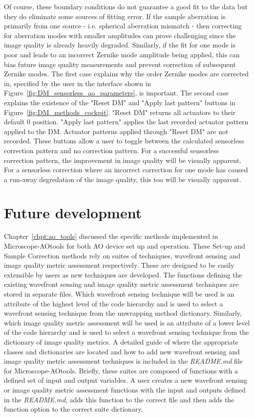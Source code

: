 Of course, these boundary conditions do not guarantee a good fit to the data but they do eliminate some sources of fitting error. If the sample aberration is primarily from one source - i.e. spherical aberration mismatch - then correcting for aberration modes with smaller amplitudes can prove challenging since the image quality is already heavily degraded. Similarly, if the fit for one mode is poor and leads to an incorrect Zernike mode amplitude being applied, this can bias future image quality measurements and prevent correction of subsequent Zernike modes. The first case explains why the order Zernike modes are corrected in, specified by the user in the interface shown in Figure~\ref{fig:DM_sensorless_ao_parameters}, is important. The second case explains the existence of the "Reset DM" and "Apply last pattern" buttons in Figure~\ref{fig:DM_methods_cockpit}. "Reset DM" returns all actuators to their default 0 position. "Apply last pattern" applies the last recorded actuator pattern applied to the DM. Actuator patterns applied through "Reset DM" are not recorded. These buttons allow a user to toggle between the calculated sensorless correction pattern and no correction pattern. For a successful sensorless correction pattern, the improvement in image quality will be visually apparent. For a sensorless correction where an incorrect correction for one mode has caused a run-away degredation of the image quality, this too will be visually apparent.

\section{Future development}
\label{sec:future_dev}

Chapter~\ref{chpt:ao_tools} discussed the specific methods implemented in 
Microscope-AOtools for both AO device set up and operation. These Set-up 
and  Sample Correction methods rely on suites of techniques, wavefront 
sensing and image quality metric assessment respectively. These are 
designed to be easily extensible by users as new techniques are developed. 
The functions defining the existing wavefront sensing and image quality 
metric assessment techniques are stored in separate files. Which wavefront 
sensing technique will be used is an attribute of the highest level
of the code hierarchy and is used to select a wavefront sensing technique 
from the unwrapping method dictionary. Similarly, which image quality 
metric assessment will be used is an attribute of a lower level	of the 
code hierarchy and is used to select a wavefront sensing technique from 
the dictionary of image quality metrics. A detailed guide of where the 
appropriate classes and dictionaries are located and how to add new 
wavefront sensing and image quality metric assessment techniques is 
included in the \textit{README.md} file for Microscope-AOtools. Briefly, 
these suites are composed of functions with a defined set of input and 
output variables. A user creates a new wavefront sensing or image 
quality metric assessment functions with the input and outputs defined 
in the \textit{README.md}, adds this function to the correct file and 
then adds the function option to the correct suite dictionary.

